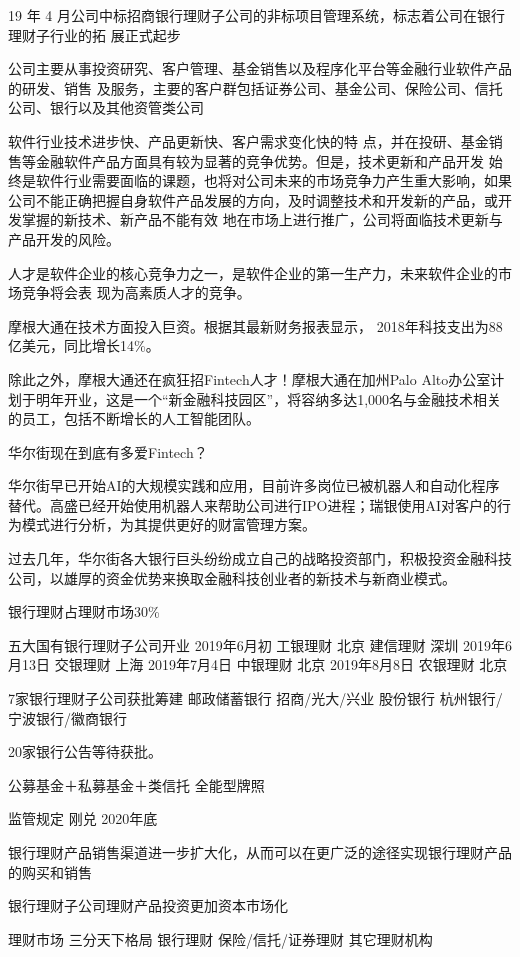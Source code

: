 \documentclass[letterpaper,12pt,english]{sphinxmanual}
\begin{document}
19 年 4 月公司中标招商银行理财子公司的非标项目管理系统，标志着公司在银行理财子行业的拓
展正式起步

公司主要从事投资研究、客户管理、基金销售以及程序化平台等金融行业软件产品的研发、销售 及服务，主要的客户群包括证券公司、基金公司、保险公司、信托公司、银行以及其他资管类公司

软件行业技术进步快、产品更新快、客户需求变化快的特 点，并在投研、基金销售等金融软件产品方面具有较为显著的竞争优势。但是，技术更新和产品开发 始终是软件行业需要面临的课题，也将对公司未来的市场竞争力产生重大影响，如果公司不能正确把握自身软件产品发展的方向，及时调整技术和开发新的产品，或开发掌握的新技术、新产品不能有效
地在市场上进行推广，公司将面临技术更新与产品开发的风险。

人才是软件企业的核心竞争力之一，是软件企业的第一生产力，未来软件企业的市场竞争将会表 现为高素质人才的竞争。

摩根大通在技术方面投入巨资。根据其最新财务报表显示，
2018年科技支出为88亿美元，同比增长14\%。

除此之外，摩根大通还在疯狂招Fintech人才！摩根大通在加州Palo Alto办公室计划于明年开业，这是一个“新金融科技园区”，将容纳多达1,000名与金融技术相关的员工，包括不断增长的人工智能团队。

华尔街现在到底有多爱Fintech？

华尔街早已开始AI的大规模实践和应用，目前许多岗位已被机器人和自动化程序替代。高盛已经开始使用机器人来帮助公司进行IPO进程；瑞银使用AI对客户的行为模式进行分析，为其提供更好的财富管理方案。

过去几年，华尔街各大银行巨头纷纷成立自己的战略投资部门，积极投资金融科技公司，以雄厚的资金优势来换取金融科技创业者的新技术与新商业模式。

银行理财占理财市场30\%

五大国有银行理财子公司开业
2019年6月初
工银理财 北京
建信理财 深圳
2019年6月13日
交银理财 上海
2019年7月4日
中银理财 北京
2019年8月8日
农银理财 北京

7家银行理财子公司获批筹建
邮政储蓄银行
招商/光大/兴业 股份银行
杭州银行/宁波银行/徽商银行

20家银行公告等待获批。

公募基金＋私募基金＋类信托 全能型牌照

监管规定 刚兑 2020年底

银行理财产品销售渠道进一步扩大化，从而可以在更广泛的途径实现银行理财产品的购买和销售

银行理财子公司理财产品投资更加资本市场化

理财市场 三分天下格局 银行理财 保险/信托/证券理财 其它理财机构
\end{document}
